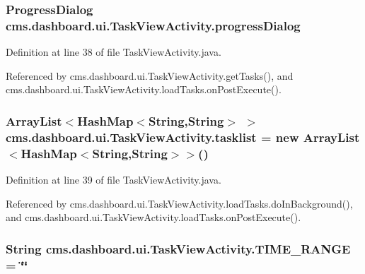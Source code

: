 \subsubsection[{progress\-Dialog}]{\setlength{\rightskip}{0pt plus 5cm}\-Progress\-Dialog {\bf cms.\-dashboard.\-ui.\-Task\-View\-Activity.\-progress\-Dialog}\hspace{0.3cm}{\ttfamily  [private]}}\label{classcms_1_1dashboard_1_1ui_1_1_task_view_activity_a30e4dd27ca573b9457ac16fc196c515c}


\-Definition at line 38 of file \-Task\-View\-Activity.\-java.



\-Referenced by cms.\-dashboard.\-ui.\-Task\-View\-Activity.\-get\-Tasks(), and cms.\-dashboard.\-ui.\-Task\-View\-Activity.\-load\-Tasks.\-on\-Post\-Execute().

\subsubsection[{tasklist}]{\setlength{\rightskip}{0pt plus 5cm}\-Array\-List$<$\-Hash\-Map$<$\-String,\-String$>$ $>$ {\bf cms.\-dashboard.\-ui.\-Task\-View\-Activity.\-tasklist} = new \-Array\-List$<$\-Hash\-Map$<$\-String,\-String$>$$>$()\hspace{0.3cm}{\ttfamily  [package]}}\label{classcms_1_1dashboard_1_1ui_1_1_task_view_activity_abdd534e58ffcddaa3185bd8ee4be80e5}


\-Definition at line 39 of file \-Task\-View\-Activity.\-java.



\-Referenced by cms.\-dashboard.\-ui.\-Task\-View\-Activity.\-load\-Tasks.\-do\-In\-Background(), and cms.\-dashboard.\-ui.\-Task\-View\-Activity.\-load\-Tasks.\-on\-Post\-Execute().

\subsubsection[{\-T\-I\-M\-E\-\_\-\-R\-A\-N\-G\-E}]{\setlength{\rightskip}{0pt plus 5cm}\-String {\bf cms.\-dashboard.\-ui.\-Task\-View\-Activity.\-T\-I\-M\-E\-\_\-\-R\-A\-N\-G\-E} = \char`\"{}\char`\"{}\hspace{0.3cm}{\ttfamily  [private]}}\label{classcms_1_1dashboard_1_1ui_1_1_task_view_activity_a5f269009582e20f268564de5327afcbb}


